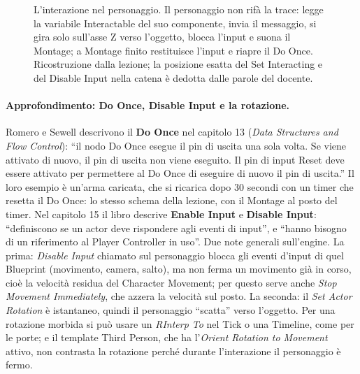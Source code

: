 \begin{figure}[htbp]
\caption{L'interazione nel personaggio. Il personaggio non rifà la trace: legge la variabile
Interactable del suo componente, invia il messaggio, si gira solo sull'asse Z verso
l'oggetto, blocca l'input e suona il Montage; a Montage finito restituisce l'input e riapre
il Do Once. Ricostruzione dalla lezione; la posizione esatta del Set Interacting e del
Disable Input nella catena è dedotta dalle parole del docente.}
\label{ue12:fig:player}
\end{figure}

\paragraph{Approfondimento: Do Once, Disable Input e la rotazione.} Romero e Sewell
descrivono il \textbf{Do Once} nel capitolo 13 (\emph{Data Structures and Flow Control}):
``il nodo Do Once esegue il pin di uscita una sola volta. Se viene attivato di nuovo, il pin
di uscita non viene eseguito. Il pin di input Reset deve essere attivato per permettere al
Do Once di eseguire di nuovo il pin di uscita.'' Il loro esempio è un'arma caricata, che si
ricarica dopo 30 secondi con un timer che resetta il Do Once: lo stesso schema
della lezione, con il Montage al posto del timer. Nel capitolo 15 il libro descrive
\textbf{Enable Input} e \textbf{Disable Input}: ``definiscono se un actor deve rispondere agli
eventi di input'', e ``hanno bisogno di un riferimento al Player Controller in uso''. Due
note generali sull'engine. La prima: \emph{Disable Input} chiamato sul personaggio blocca
gli eventi d'input di quel Blueprint (movimento, camera, salto), ma non ferma un movimento
già in corso, cioè la velocità residua del Character Movement; per questo serve anche
\emph{Stop Movement Immediately}, che azzera la velocità sul posto. La seconda: il
\emph{Set Actor Rotation} è istantaneo, quindi il personaggio ``scatta'' verso l'oggetto. Per
una rotazione morbida si può usare un \emph{RInterp To} nel Tick o una Timeline, come per le
porte; e il template Third Person, che ha l'\emph{Orient Rotation to Movement} attivo, non
contrasta la rotazione perché durante l'interazione il personaggio è fermo.

